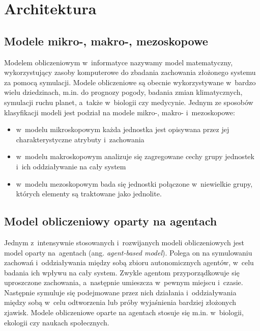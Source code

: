 \section{Architektura}

\subsection{Modele mikro-, makro-, mezoskopowe}
Modelem obliczeniowym w~informatyce nazywamy model matematyczny, wykorzystujący zasoby komputerowe do zbadania zachowania złożonego systemu za pomocą symulacji\cite{model}. Modele obliczeniowe są obecnie wykorzystywane w~bardzo wielu dziedzinach, m.in. do prognozy pogody, badania zmian klimatycznych, symulacji ruchu planet, a~także w~biologii czy medycynie. Jednym ze sposobów klasyfikacji modeli jest podział na modele mikro-, makro- i~mezoskopowe\cite{micmac}:
\begin{itemize}
\item w~modelu mikroskopowym każda jednostka jest opisywana przez jej charakterystyczne atrybuty i~zachowania
\item w~modelu makroskopowym analizuje się zagregowane cechy grupy jednostek i~ich oddziaływanie na cały system
\item w~modelu mezoskopowym bada się jednostki połączone w~niewielkie grupy, których elementy są traktowane jako jednolite.
\end{itemize}
\subsection{Model obliczeniowy oparty na agentach}
Jednym z~intensywnie stosowanych i~rozwijanych modeli obliczeniowych jest model oparty na~agentach (ang. \textit{agent-based model}).
Polega on na symulowaniu zachowań i~oddziaływania między sobą zbioru autonomicznych agentów, w~celu badania ich wpływu na cały system\cite{agent-based}. Zwykle agentom przyporządkowuje się uproszczone zachowania, a~następnie umieszcza w~pewnym miejscu i~czasie. Następnie symuluje się podejmowane przez nich działania i~oddziaływania między sobą w~celu odtworzenia lub próby wyjaśnienia bardziej złożonych zjawisk. Modele obliczeniowe oparte na agentach stosuje się m.in. w~biologii, ekologii czy naukach społecznych.
